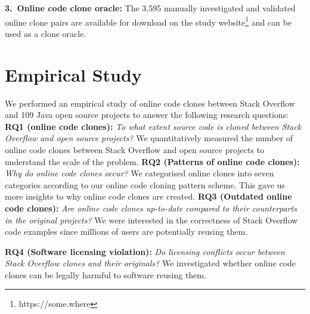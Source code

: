 \documentclass{sig-alternate-05-2015}
\begin{document}
\vspace{0.5ex}%
\noindent\textbf{3.~Online code clone oracle:} The 3,595 manually investigated and validated online clone pairs are available for download on the study website\footnote{https://some.where} and can be used as a clone oracle.

\section{Empirical Study}
We performed an empirical study of online code clones between Stack Overflow and 109 Java open source projects to answer the following research questions: \\ 
\textbf{RQ1 (online code clones):} \textit{To what extent  source code is cloned between Stack Overflow and open source projects?} We quantitatively measured the number of online code clones between Stack Overflow and open source projects to understand the scale of the problem. \newline
\textbf{RQ2 (Patterns of online code clones):} \textit{Why do online code clones occur?} We categorised online clones into seven categories according to our online code cloning pattern scheme. This gave us more insights to why online code clones are created. %
\newline
\textbf{RQ3 (Outdated online code clones):} \textit{Are online code clones up-to-date compared to their counterparts in the original projects?} We were interested in the correctness of Stack Overflow code examples since millions of users are potentially reusing them.  %

\textbf{RQ4 (Software licensing violation):} \textit{Do licensing conflicts occur between Stack Overflow clones and their originals?} We investigated whether online code clones can be legally harmful to software reusing them.
\end{document}
